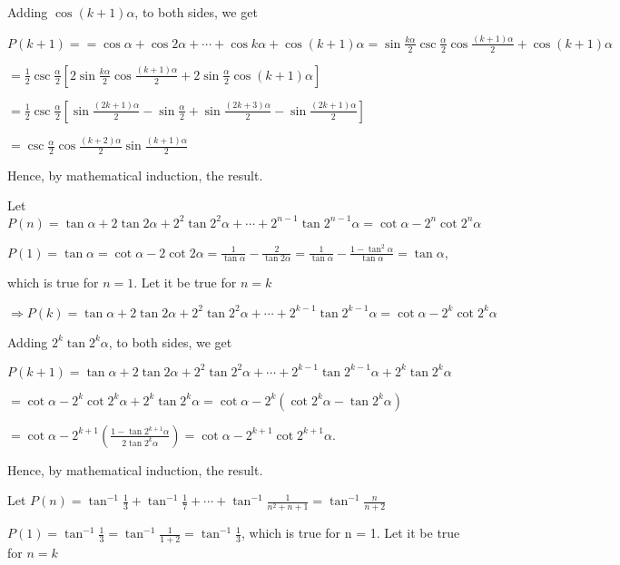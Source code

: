   Adding $\cos(k + 1)\alpha$, to both sides, we get

  $P(k + 1) = = \cos\alpha + \cos2\alpha + \cdots + \cos k\alpha + \cos(k + 1)\alpha =
  \sin\frac{k\alpha}{2}\csc\frac{\alpha}{2}\cos\frac{(k + 1)\alpha}{2} + \cos(k + 1)\alpha$

  $= \frac{1}{2}\csc\frac{\alpha}{2}\left[2\sin\frac{k\alpha}{2}\cos\frac{(k + 1)\alpha}{2} +
    2\sin\frac{\alpha}{2}\cos(k + 1)\alpha\right]$

  $=\frac{1}{2}\csc\frac{\alpha}{2}\left[\sin\frac{(2k + 1)\alpha}{2} - \sin\frac{\alpha}{2} + \sin\frac{(2k
      + 3)\alpha}{2} - \sin\frac{(2k + 1)\alpha}{2}\right]$

  $= \csc\frac{\alpha}{2}\cos\frac{(k + 2)\alpha}{2}\sin\frac{(k + 1)\alpha}{2}$

  Hence, by mathematical induction, the result.
\item Let $P(n) = \tan\alpha + 2\tan2\alpha + 2^2\tan2^2\alpha + \cdots + 2^{n - 1}\tan2^{n - 1}\alpha =
  \cot\alpha - 2^n\cot2^n\alpha$

  $P(1) = \tan\alpha = \cot\alpha - 2\cot2\alpha = \frac{1}{\tan\alpha} - \frac{2}{\tan2\alpha} =
  \frac{1}{\tan\alpha} - \frac{1 - \tan^2\alpha}{\tan\alpha} = \tan\alpha$,

  which is true for $n = 1$. Let it be true for $n = k$

  $\Rightarrow P(k) = \tan\alpha + 2\tan2\alpha + 2^2\tan2^2\alpha + \cdots + 2^{k - 1}\tan2^{k - 1}\alpha =
  \cot\alpha - 2^k\cot2^k\alpha$

  Adding $2^k\tan2^k\alpha$, to both sides, we get

  $P(k + 1) = \tan\alpha + 2\tan2\alpha + 2^2\tan2^2\alpha + \cdots + 2^{k - 1}\tan2^{k - 1}\alpha +
  2^k\tan2^k\alpha$

  $= \cot\alpha - 2^k\cot2^k\alpha + 2^k\tan2^k\alpha = \cot\alpha - 2^k\left(\cot2^k\alpha -
  \tan2^k\alpha\right)$

  $= \cot\alpha - 2^{k+ 1}\left(\frac{1 - \tan2^{k + 1}\alpha}{2\tan2^k\alpha}\right) = \cot\alpha - 2^{k +
    1}\cot2^{k + 1}\alpha$.

  Hence, by mathematical induction, the result.
\item Let $P(n) = \tan^{-1}\frac{1}{3} + \tan^{-1}\frac{1}{7} + \cdots + \tan^{-1}\frac{1}{n^2 + n + 1} =
  \tan^{-1}\frac{n}{n + 2}$

  $P(1) = \tan^{-1}\frac{1}{3} = \tan^{-1}\frac{1}{1 + 2} = \tan^{-1}\frac{1}{3}$, which is true for n =
  1. Let it be true for $n = k$

